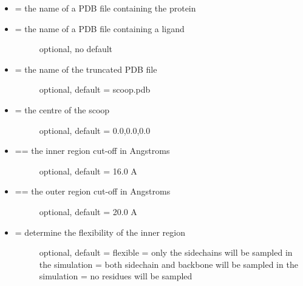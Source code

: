 \documentclass[letterpaper,10pt,english]{sphinxmanual}
\begin{document}
\begin{itemize}
\item {} 
 = the name of a PDB file containing the protein

\item {} \begin{description}
\item[{ = the name of a PDB file containing a ligand}] \leavevmode
optional, no default

\end{description}

\item {} \begin{description}
\item[{ = the name of the truncated PDB file}] \leavevmode
optional, default = scoop.pdb

\end{description}

\item {} \begin{description}
\item[{ = the centre of the scoop}] \leavevmode
optional, default = 0.0,0.0,0.0

\end{description}

\item {} \begin{description}
\item[{ == the inner region cut-off in Angstroms}] \leavevmode
optional, default = 16.0 A

\end{description}

\item {} \begin{description}
\item[{ == the outer region cut-off in Angstroms}] \leavevmode
optional, default = 20.0 A

\end{description}

\item {} \begin{description}
\item[{ = determine the flexibility of the inner region}] \leavevmode
optional, default = flexible
 = only the sidechains will be sampled in the simulation
 = both sidechain and backbone will be sampled in the simulation
 = no residues will be sampled


\end{description}
\end{itemize}
\end{document}
